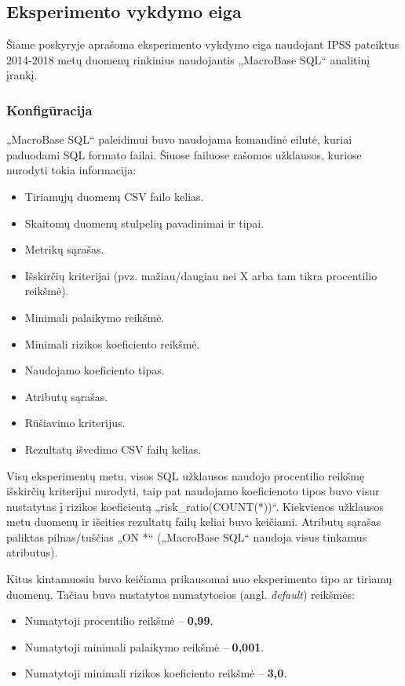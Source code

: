 \documentclass{VUMIFPSbakalaurinis}
\begin{document}
\subsection{Eksperimento vykdymo eiga}
Šiame poskyryje aprašoma eksperimento vykdymo eiga naudojant IPSS pateiktus 2014-2018 metų duomenų rinkinius naudojantis „MacroBase SQL“ analitinį įrankį.

\subsubsection{Konfigūracija} \label{subsubsec:conf}
„MacroBase SQL“ paleidimui buvo naudojama komandinė eilutė, kuriai paduodami SQL formato failai. Šiuose failuose rašomos užklausos, kuriose nurodyti tokia informacija:
\begin{itemize}
	\item Tiriamųjų duomenų CSV failo kelias.
	\item Skaitomų duomenų stulpelių pavadinimai ir tipai.
	\item Metrikų sąrašas.
	\item Išskirčių kriterijai (pvz. mažiau/daugiau nei X arba tam tikra procentilio reikšmė).
	\item Minimali palaikymo reikšmė.
	\item Minimali rizikos koeficiento reikšmė.
	\item Naudojamo koeficiento tipas.
	\item Atributų sąrašas.
	\item Rūšiavimo kriterijus.
	\item Rezultatų išvedimo CSV failų kelias.
\end{itemize}
Visų eksperimentų metu, visos SQL užklausos naudojo procentilio reikšmę išskirčių kriterijui nurodyti, taip pat naudojamo koeficienoto tipos buvo visur nustatytas į rizikos koeficientą „risk\_ratio(COUNT(*))“. Kiekvienos užklausos metu duomenų ir išeities rezultatų failų keliai buvo keičiami. Atributų sąrašas paliktas pilnas/tuščias „ON *“ („MacroBase SQL“ naudoja visus tinkamus atributus).\par
Kitus kintamuosiu buvo keičiama prikausomai nuo eksperimento tipo ar tiriamų duomenų. Tačiau buvo nustatytos numatytosios (angl. \textit{default}) reikšmės:
\begin{itemize}
	\item Numatytoji procentilio reikšmė – \textbf{0,99}.
	\item Numatytoji minimali palaikymo reikšmė – \textbf{0,001}.
	\item Numatytoji minimali rizikos koeficiento reikšmė – \textbf{3,0}.
\end{itemize}
\end{document}
